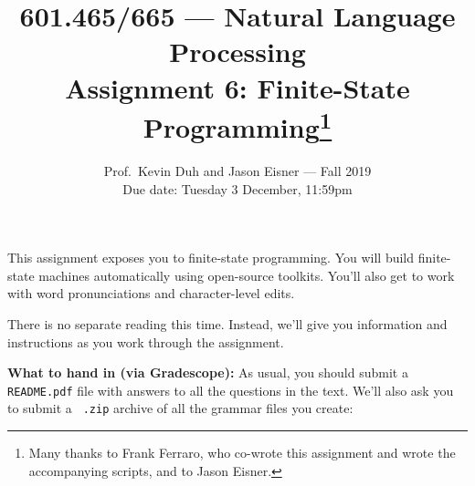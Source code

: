 \documentclass[11pt]{article}
\newcommand{\handinsym}{\color{blue}{\HandLeftUp}}
\newcounter{handin}
\newcommand{\largehandin}{\marginpar{\hfill\LARGE\handinsym}}
\begin{document}
\title{\vspace{-1in}601.465/665 --- Natural Language Processing \\
  Assignment 6: Finite-State Programming\footnote{Many thanks to Frank Ferraro, who
    co-wrote this assignment and wrote the accompanying scripts, and to Jason Eisner.}}
\author{Prof.~Kevin Duh and Jason Eisner --- Fall 2019 \\
  Due date: Tuesday 3 December, 11:59pm  }
\date{}
\maketitle\thispagestyle{empty}

This assignment exposes you to finite-state programming.  You will
build finite-state machines automatically using open-source toolkits.
You'll also get to work with word pronunciations and character-level edits.

\medskip
\noindent{}

\medskip
{} There is no separate reading this time.  Instead, we'll give you
information and instructions as you work through the assignment.

\medskip\noindent
{\bf What to hand in (via Gradescope):}
  \largehandin As usual, you should submit a {\tt README.pdf} file with answers to
  all the questions in the text.  We'll also ask you to submit a {\tt
    .zip} archive of all the grammar files you create:
\end{document}
